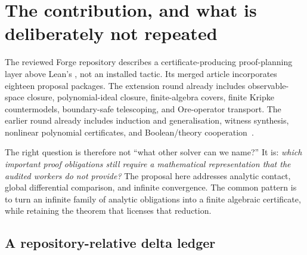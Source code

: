 \documentclass[11pt,a4paper]{article}
\theoremstyle{definition}\newtheorem{definition}[theorem]{Definition}
\newcommand{\code}[1]{\texttt{\detokenize{#1}}}
\begin{document}
\tableofcontents
\newpage

\section{The contribution, and what is deliberately not repeated}
\label{sec:delta}

The reviewed Forge repository describes a certificate-producing proof-planning
layer above Lean's \code{grind}, not an installed tactic. Its merged article
incorporates eighteen proposal packages. The extension round already includes
observable-space closure, polynomial-ideal closure, finite-algebra covers,
finite Kripke countermodels, boundary-safe telescoping, and Ore-operator
transport. The earlier round already includes induction and generalisation,
witness synthesis, nonlinear polynomial certificates, and Boolean/theory
cooperation~\cite{forge-readme,forge-ledger,forge-conclusion}.

The right question is therefore not ``what other solver can we name?'' It is:
\emph{which important proof obligations still require a mathematical representation
that the audited workers do not provide?} The proposal here addresses analytic
contact, global differential comparison, and infinite convergence. The common
pattern is to turn an infinite family of analytic obligations into a finite
algebraic certificate, while retaining the theorem that licenses that reduction.

\subsection{A repository-relative delta ledger}
\end{document}
